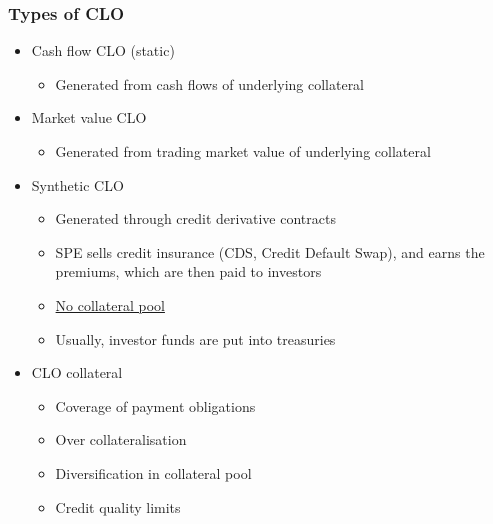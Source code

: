 \documentclass[../notes_compiled.tex]{subfiles}
\begin{document}
\subsubsection{Types of CLO}
\begin{itemize}
\item Cash flow CLO (static)
\begin{itemize}
\item Generated from cash flows of underlying collateral
\end{itemize}
\item Market value CLO
\begin{itemize}
\item Generated from trading market value of underlying collateral
\end{itemize}
\item Synthetic CLO
\begin{itemize}
\item Generated through credit derivative contracts
\item SPE sells credit insurance (CDS, Credit Default Swap), and earns the premiums, which are then paid to investors
\item \underline{No collateral pool}
\item Usually, investor funds are put into treasuries
\end{itemize}
\item CLO collateral
\begin{itemize}
\item Coverage of payment obligations
\item Over collateralisation
\item Diversification in collateral pool
\item Credit quality limits
\end{itemize}
\end{itemize}
\end{document}
